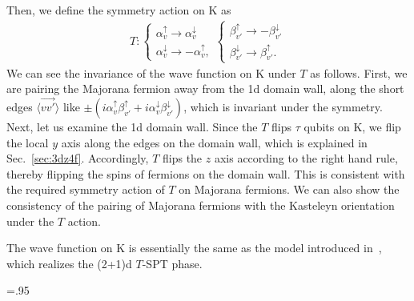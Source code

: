 \documentclass[12pt]{article}
\numberwithin{equation}{section}
\begin{document}
Then, we define the symmetry action on $\mathrm{K}$ as
\begin{align}
T:
\begin{cases}
\alpha_v^{\uparrow}\to \alpha_v^{\downarrow}\\
\alpha_v^{\downarrow}\to -\alpha_v^{\uparrow},
\end{cases}
\begin{cases}
\beta_{v'}^{\uparrow}\to -\beta_{v'}^{\downarrow}\\
\beta_{v'}^{\downarrow}\to \beta_{v'}^{\uparrow}.
\end{cases}
\end{align}
We can see the invariance of the wave function on $\mathrm{K}$ under $T$ as follows. First, we are pairing the Majorana fermion away from the 1d domain wall, along the short edges $\langle \overrightarrow{vv'}\rangle$ like $\pm(i\alpha_v^{\uparrow}\beta_{v'}^{\uparrow}+i\alpha_v^{\downarrow}\beta_{v'}^{\downarrow})$, which is invariant under the symmetry. Next, let us examine the 1d domain wall.
Since the $T$ flips $\tau$ qubits on $\mathrm{K}$, we flip the local $y$ axis along the edges on the domain wall, which is explained in Sec.~\ref{sec:3dz4f}. Accordingly, $T$ flips the $z$ axis according to the right hand rule, thereby flipping the spins of fermions on the domain wall. This is consistent with the required symmetry action of $T$ on Majorana fermions.
We can also show the consistency of the pairing of Majorana fermions with the Kasteleyn orientation under the $T$ action.

The wave function on $\mathrm{K}$ is essentially the same as the model introduced in~\cite{Zitao}, which realizes the (2+1)d $T$-SPT phase.




\baselineskip=.95\baselineskip

\end{document}
